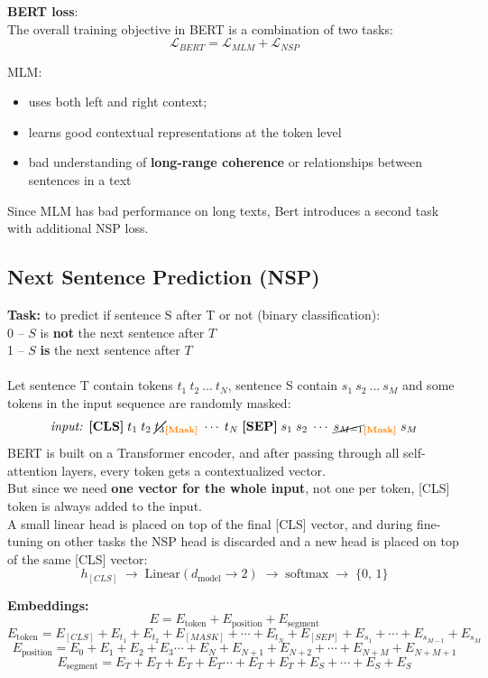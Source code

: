 \documentclass[10pt]{article}
\begin{document}
\textbf{BERT loss}:\\
The overall training objective in BERT is a combination of two tasks:
\[\mathcal{L}_{BERT} = \mathcal{L}_{MLM} + \mathcal{L}_{NSP}\]

MLM:
\begin{itemize}
    \item[+] uses both left and right context;
    \item[+] learns good contextual representations at the token level
    \item[-] bad understanding of \textbf{long-range coherence} or relationships between sentences in a text
\end{itemize}

Since MLM has bad performance on long texts, Bert introduces a second task with additional NSP loss.


\subsection*{Next Sentence Prediction (NSP)}
\textbf{Task:} to predict if sentence S after T or not (binary classification): \\
0 -- $S$ is \textbf{not} the next sentence after $T$ \\
1 --  $S$ \textbf{is} the next sentence after $T$ \\ \\
Let sentence T contain tokens $t_1 \ t_2  \ ...\  t_N$, sentence S contain  $s_1\ s_2\ ...\ s_M$ and some tokens in the input sequence are randomly masked:
\[ \text{\textit{input:  }}{\textbf{[CLS]}}\; t_1\; t_2\; \cancel{t_3}_{\textcolor{orange}{\textbf{[Mask]}}}\; \cdots\; t_N\; \textbf{[SEP]}\; s_1\; s_2\; \cdots\;
\cancel{s_{M-1}}_{\textcolor{orange}{\textbf{[Mask]}}}
\; s_M
\]
BERT is built on a Transformer encoder, and after passing through all self-attention layers, every token gets a contextualized vector.  \\
But since we need \textbf{one vector for the whole input}, not one per token, [CLS] token is always added to the input. \\
A small linear head is placed on top of the final [CLS] vector, and during fine-tuning on other tasks the NSP head is discarded and a new head is placed on top of the same [CLS] vector: 
$$h_{[CLS]} \;\rightarrow\; \text{Linear}(d_{\text{model}} \to 2) \;\rightarrow\; \text{softmax} \;\rightarrow\; \{0,\, 1\}$$

\textbf{Embeddings:} \\
$$E = E_{\text{token}} + E_{\text{position}} + E_{\text{segment}}$$
$$ E_{\text{token}} = E_{[CLS]} + E_{t_1} + E_{t_2} + E_{[MASK]} + \cdots + E_{t_N} + E_{[SEP]}+ E_{s_1} + \cdots + E_{s_{M-1}} + E_{s_M}$$
$$E_{\text{position}} = E_{0} + E_{1} + E_{2} + E_{3}\cdots + E_{N} + E_{N+1}+ E_{N+2} + \cdots +  E_{N+M}+ E_{N+M+1}$$
$$ E_{\text{segment}} = E_{T} + E_{T} + E_{T} + E_{T} \cdots + E_{T} + E_{T}+ E_{S} + \cdots + E_{S} + E_{S}$$
\end{document}
